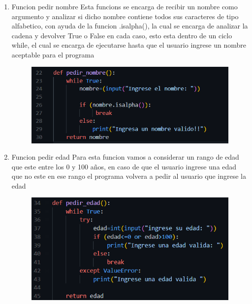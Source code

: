 \documentclass[12pt]{article}
\begin{document}
\begin{enumerate}
\item{Funcion pedir nombre}
Esta funcions se encarga de recibir un nombre como argumento y analizar si dicho nombre contiene todos sus caracteres de tipo alfabetico, con ayuda de la funcion .isalpha(), la cual se encarga de analizar la cadena y devolver True o False en cada caso, esto esta dentro de un ciclo while, el cual se encarga de ejecutarse hasta que el usuario ingrese un nombre aceptable para el programa

\begin{figure}[H]
		\begin{center}
 			\includegraphics[width = .8\textwidth]{02.png}
 			
		\end{center} 
\end{figure}

\item{Funcion pedir edad}
Para esta funcion vamos a considerar un rango de edad que este entre los 0 y 100 años,  en caso de que el usuario ingrese una edad que no este en ese rango el programa volvera a pedir al usuario que ingrese la edad
\begin{figure}[H]
		\begin{center}
 			\includegraphics[width = .8\textwidth]{03.png}
 			
		\end{center} 
\end{figure}



\end{enumerate}
\end{document}
